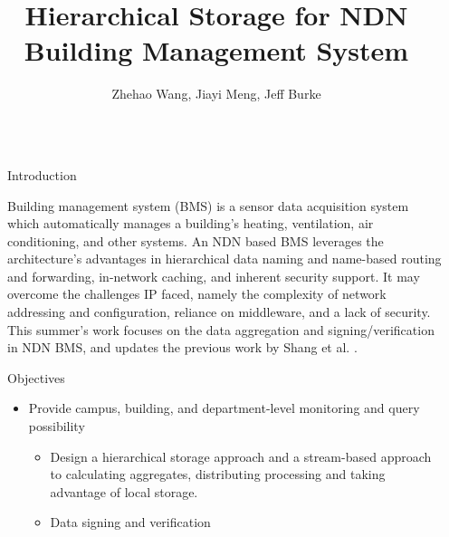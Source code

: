 \documentclass[final,hyperref={pdfpagelabels=false},20pt]{beamer}
\title{\huge Hierarchical Storage for NDN Building Management System}
\author[AuthorNames]{Zhehao Wang\inst{1}, Jiayi Meng\inst{2}, Jeff Burke\inst{3}}
\institute[Institutes]{\inst{1} \inst{2} \inst{3} UCLA REMAP}
\begin{document}

\begin{frame}[t] %

\begin{columns}[t] %

\begin{column}{.02\textwidth}\end{column} %

\begin{column}{.465\textwidth} %


\begin{block}{Introduction}

Building management system (BMS) is a sensor data acquisition system which automatically manages a building's heating, ventilation, air conditioning, and other systems. \newline
An NDN based BMS leverages the architecture's advantages in hierarchical data naming and name-based routing and forwarding, in-network caching, and inherent security support. It may overcome the challenges IP faced, namely the complexity of network addressing and configuration, reliance on middleware, and a lack of security. \newline
This summer's work focuses on the data aggregation and signing/verification in NDN BMS, and updates the previous work by Shang et al. \cite{wentao-bms}.

\end{block}


\begin{block}{Objectives}

\begin{itemize}
\item{Provide campus, building, and department-level monitoring and query possibility}
\begin{itemize}
\item{Design a hierarchical storage approach and a stream-based approach to calculating aggregates, distributing processing and taking advantage of local storage.}
\item{Data signing and verification}
\end{itemize}
\end{itemize}


\end{block}
\end{column}
\end{columns}
\end{frame}
\end{document}
